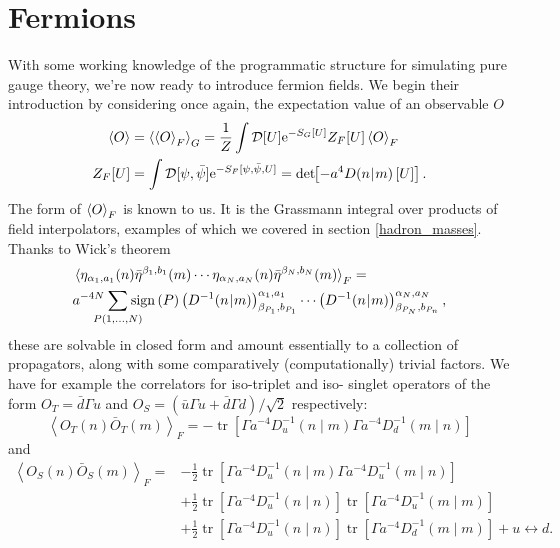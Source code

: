 \documentclass[a4paper,10pt]{book}
\begin{document}
\section{Fermions}
With some working knowledge of the programmatic structure for simulating pure gauge theory, we're now ready to introduce fermion fields. We begin their introduction by considering once again, the expectation value of an observable $O$
\begin{equation}\label{eq:compute_fermion_exp_val}
\begin{aligned}
\braket{O}&=\braket{\braket{O}_{F}}_G=\frac{1}{Z} \int \mathcal{D}[U] \mathrm{e}^{-S_{G}[U]} Z_{F}[U] \braket{O}_{F}\\
Z_{F}[U]&=\int \mathcal{D}[\psi, \bar{\psi}] \mathrm{e}^{-S_{F}[\psi, \bar{\psi}, U]}=\operatorname{det}\mkern-5mu\left[ -a^4D(n\mkern-4mu\mid \mkern-4mu m)\left[ U \right] \right].
\end{aligned}
\end{equation}
The form of $\braket{O}_{F}$ is known to us. It is the Grassmann integral over products of field interpolators, examples of which we covered in section \ref{hadron_masses}. Thanks to Wick's theorem
\begin{equation}
\begin{aligned}
&\braket{\eta_{\alpha_1,a_1}(n)\bar{\eta}^{\beta_1,b_1}(m)\cdots\eta_{\alpha_N,a_N}(n)\bar{\eta}^{\beta_N,b_N}(m)}_F = \\&a^{-4N} \mkern-18mu\sum\limits_{P(1,\ldots,N)}\mkern-18mu\operatorname{sign}\left( P \right)\left( D^{-1}(n\mkern-4mu\mid \mkern-4mu m) \right)_{\beta_{P_1},b_{P_1}}^{\alpha_1,a_1}\cdots\left( D^{-1}(n\mkern-4mu\mid \mkern-4mu m) \right)_{\beta_{P_N},b_{P_n}}^{\alpha_N,a_N},
\end{aligned}
\end{equation}
these are solvable in closed form and amount essentially to a collection of propagators, along with some comparatively (computationally) trivial factors. We have for example the correlators for iso-triplet and iso- singlet operators of the form $O_{T}=\bar{d} \Gamma u$ and $O_{S}=(\bar{u} \Gamma u+\bar{d} \Gamma d) / \sqrt{2}$ respectively:
\begin{equation}
\left\langle O_{T}(n) \bar{O}_{T}(m)\right\rangle_{F}=-\operatorname{tr}\left[\Gamma a^{-4}D_{u}^{-1}(n \mid m) \Gamma a^{-4}D_{d}^{-1}(m \mid n)\right]
\end{equation}
and
\begin{equation}
\begin{aligned}
\left\langle O_{S}(n) \bar{O}_{S}(m)\right\rangle_{F}=&-\frac{1}{2} \operatorname{tr}\left[\Gamma a^{-4}D_{u}^{-1}(n \mid m) \Gamma a^{-4}D_{u}^{-1}(m \mid n)\right] \\
&+\frac{1}{2} \operatorname{tr}\left[\Gamma a^{-4}D_{u}^{-1}(n \mid n)\right] \operatorname{tr}\left[\Gamma a^{-4}D_{u}^{-1}(m \mid m)\right] \\
&+\frac{1}{2} \operatorname{tr}\left[\Gamma a^{-4}D_{u}^{-1}(n \mid n)\right] \operatorname{tr}\left[\Gamma a^{-4}D_{d}^{-1}(m \mid m)\right]+u \leftrightarrow d.
\end{aligned}
\end{equation}
\end{document}
